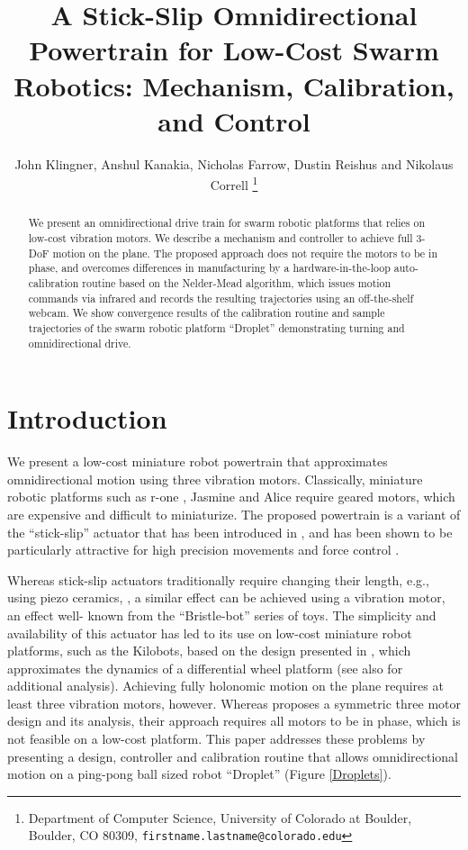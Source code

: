 \documentclass[letterpaper, 10pt, conference]{ieeeconf}
\title{\LARGE \bf
A Stick-Slip Omnidirectional Powertrain for Low-Cost Swarm Robotics: Mechanism, Calibration, and Control
}
\author{John Klingner, Anshul Kanakia, Nicholas Farrow, Dustin Reishus and Nikolaus Correll%
\thanks{Department of Computer Science,
University of Colorado at Boulder,
 Boulder, CO 80309,
{\tt\small firstname.lastname{@}colorado.edu}}%
}
\begin{document}
\maketitle


\begin{abstract}
We present an omnidirectional drive train for swarm robotic platforms that relies on low-cost vibration motors. We describe a mechanism and controller to achieve full 3-DoF motion on the plane. The proposed approach does not require the motors to be in phase, and overcomes differences in manufacturing by a hardware-in-the-loop auto-calibration routine based on the Nelder-Mead algorithm, which issues motion commands via infrared and records the resulting trajectories using an off-the-shelf webcam. We show convergence results of the calibration routine and sample trajectories of the swarm robotic platform ``Droplet'' demonstrating turning and omnidirectional drive.   
\end{abstract}



\section{Introduction}
We present a low-cost miniature robot powertrain that approximates omnidirectional motion using three vibration motors. Classically, miniature robotic platforms such as r-one \cite{mclurkin2013low}, Jasmine \cite{jasmine} and Alice \cite{alice} require geared motors, which are expensive and difficult to miniaturize. The proposed powertrain is a variant of the ``stick-slip'' actuator that has been introduced in \cite{breguet1998stick}, and has been shown to be particularly attractive for high precision movements \cite{brufau2005micron,chu2006novel,martel2001three,martel2005fundamental,eigoli2012locomotion} and force control \cite{vartholomeos2008analysis}.   

Whereas stick-slip actuators traditionally require changing their length, e.g., using piezo ceramics,  \cite{breguet1998stick, martel2005fundamental}, a similar effect can be achieved using a vibration motor, an effect well- known from the ``Bristle-bot'' series of toys. The simplicity and availability of this actuator  has led to its use on low-cost miniature robot platforms, such as the Kilobots, \cite{rubenstein2012kilobot} based on the design presented in \cite{Vartholomeos2006}, which approximates the dynamics of a differential wheel platform (see also \cite{spartali2013speed} for additional analysis). Achieving fully holonomic motion on the plane requires at least three vibration motors, however. Whereas \cite{Vartholomeos2005} proposes a symmetric three motor design and its analysis, their approach requires all motors to be in phase, which is not feasible on a low-cost platform. This paper addresses these problems by presenting a design, controller and calibration routine that allows omnidirectional motion on a ping-pong ball sized robot ``Droplet'' (Figure \ref{Droplets}).
\end{document}
